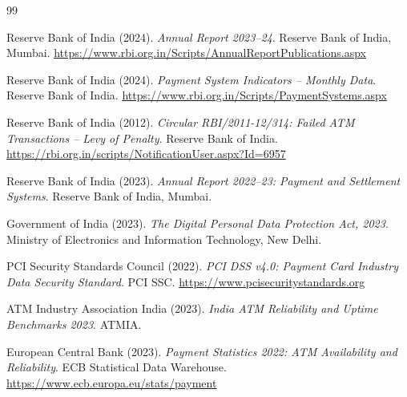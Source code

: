 \documentclass[11pt,a4paper]{article}
\begin{document}

\begin{thebibliography}{99}

Reserve Bank of India (2024).
\newblock \textit{Annual Report 2023--24}.
\newblock Reserve Bank of India, Mumbai.
\newblock \url{https://www.rbi.org.in/Scripts/AnnualReportPublications.aspx}

Reserve Bank of India (2024).
\newblock \textit{Payment System Indicators -- Monthly Data}.
\newblock Reserve Bank of India.
\newblock \url{https://www.rbi.org.in/Scripts/PaymentSystems.aspx}

Reserve Bank of India (2012).
\newblock \textit{Circular RBI/2011-12/314: Failed ATM Transactions -- Levy of Penalty}.
\newblock Reserve Bank of India.
\newblock \url{https://rbi.org.in/scripts/NotificationUser.aspx?Id=6957}

Reserve Bank of India (2023).
\newblock \textit{Annual Report 2022--23: Payment and Settlement Systems}.
\newblock Reserve Bank of India, Mumbai.

Government of India (2023).
\newblock \textit{The Digital Personal Data Protection Act, 2023}.
\newblock Ministry of Electronics and Information Technology, New Delhi.

PCI Security Standards Council (2022).
\newblock \textit{PCI DSS v4.0: Payment Card Industry Data Security Standard}.
\newblock PCI SSC.
\newblock \url{https://www.pcisecuritystandards.org}

ATM Industry Association India (2023).
\newblock \textit{India ATM Reliability and Uptime Benchmarks 2023}.
\newblock ATMIA.

European Central Bank (2023).
\newblock \textit{Payment Statistics 2022: ATM Availability and Reliability}.
\newblock ECB Statistical Data Warehouse.
\newblock \url{https://www.ecb.europa.eu/stats/payment}

\end{thebibliography}
\end{document}
